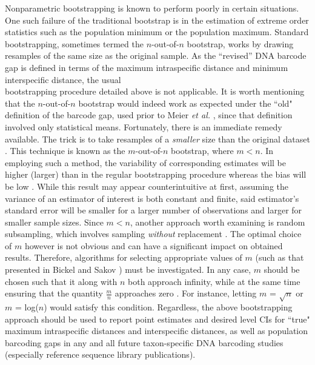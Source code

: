 Nonparametric bootstrapping is known to perform poorly in certain situations. One such failure of the traditional bootstrap is in the estimation of extreme order statistics such as the population minimum or the population maximum. Standard bootstrapping, sometimes termed the $n$-out-of-$n$ bootstrap, works by drawing resamples of the same size as the original sample. As the ``revised'' DNA barcode gap is defined in terms of the maximum intraspecific distance and minimum interspecific distance, the usual \\ bootstrapping procedure detailed above is not applicable. It is worth mentioning that the $n$-out-of-$n$ bootstrap would indeed work as expected under the ``old" definition of the barcode gap, used prior to Meier \textit{et al.} \cite{meier2008use}, since that definition involved only statistical means. Fortunately, there is an immediate remedy available. The trick is to take resamples of a \textit{smaller} size than the original dataset \cite{bickel1997resampling}. This technique is known as the $m$-out-of-$n$ bootstrap, where $m < n$. In employing such a method, the variability of corresponding estimates will be higher (larger) than in the regular bootstrapping procedure whereas the bias will be low \cite{chernick2007bootstrap, chernick2011bootstrap}. While this result may appear counterintuitive at first, assuming the variance of an estimator of interest is both constant and finite, said estimator's standard error will be smaller for a larger number of observations and larger for smaller sample sizes. Since $m < n$, another approach worth examining is random subsampling, which involves sampling \textit{without} replacement \cite{politis1999subsampling}. The optimal choice of $m$ however is not obvious and can have a significant impact on obtained results. Therefore, algorithms for selecting appropriate values of $m$ (such as that presented in Bickel and Sakov \cite{bickel2008choice}) must be investigated. In any case, $m$ should be chosen such that it along with $n$ both approach infinity, while at the same time ensuring that the quantity $\frac{m}{n}$ approaches zero \cite{chernick2007bootstrap, chernick2011bootstrap}. For instance, letting $m$ = $\sqrt{n}$ or $m$ = log($n$) would satisfy this condition. Regardless, the above bootstrapping approach should be used to report point estimates and desired level CIs for ``true" maximum intraspecific distances and interspecific distances, as well as population barcoding gaps in any and all future taxon-specific DNA barcoding studies (especially reference sequence library publications).



